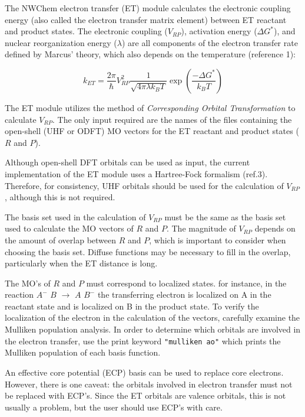 \label{sec:etrans}

The NWChem electron transfer (ET) module calculates the electronic coupling energy (also called the electron transfer
matrix element) between ET reactant and product states.  The electronic coupling ($V_{RP}$), activation energy ($\Delta G^{*}$),
and nuclear reorganization energy ($\lambda$) are all components of the electron transfer rate defined by Marcus' theory, which
also depends on the temperature (reference 1):

\begin{equation}
{k_{ET}}=
\frac{2\pi}{\hbar}
V_{RP}^{2}
\frac{1}{\sqrt{4\pi \lambda k_{B}T}}
\exp \left( \frac{- \Delta G^{*}}{k_{B} T} \right)
\end{equation}

The ET module utilizes the method of {\em Corresponding Orbital Transformation} to calculate $V_{RP}$.
The only input required are the names
of the files containing the open-shell (UHF or ODFT) MO vectors for the ET reactant and product states ($R$ and $P$).

Although open-shell DFT orbitals can be used as input, the current implementation of the ET module uses a Hartree-Fock 
formalism (ref.3).  Therefore, for consistency, UHF orbitals should be used for the calculation of $V_{RP}$, although this
is not required.

The basis set used in the calculation of $V_{RP}$ must be the same as the basis set used to calculate the MO vectors of
$R$ and $P$.  The magnitude of $V_{RP}$ depends on the amount of overlap between $R$ and $P$,
which is important to consider when choosing the basis set.  Diffuse functions may be
necessary to fill in the overlap, particularly when the ET distance is long.

The MO's of $R$ and $P$ must correspond to localized states.  for instance, in the reaction $A^{ -}$ $B$ $\rightarrow$ $A$ $B^{ -}$
the transferring electron is localized on A in the reactant state and is localized on B in the product state.
To verify the localization of the electron in the calculation of the vectors, carefully examine the Mulliken population
analysis.  In order to determine which orbitals are involved in the electron transfer, use the print keyword \verb+"mulliken ao"+ 
which prints the Mulliken population of each basis function.

An effective core potential (ECP) basis can be used to replace core electrons.  However, there is one caveat: the orbitals
involved in electron transfer must not be replaced with ECP's.  Since the ET orbitals are valence orbitals, this is not usually
a problem, but the user should use ECP's with care.

